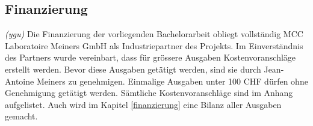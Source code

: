 \subsection{Finanzierung}
\textit{(ygu)} Die Finanzierung der vorliegenden Bachelorarbeit obliegt vollständig MCC Laboratoire Meiners GmbH als Industriepartner des Projekts. Im Einverständnis des Partners wurde vereinbart, dass für grössere Ausgaben Kostenvoranschläge erstellt werden. Bevor diese Ausgaben getätigt werden, sind sie durch Jean-Antoine Meiners zu genehmigen. Einmalige Ausgaben unter 100 CHF dürfen ohne Genehmigung getätigt werden. Sämtliche Kostenvoranschläge sind im Anhang aufgelistet. Auch wird im Kapitel \ref{finanzierung} eine Bilanz aller Ausgaben gemacht. 